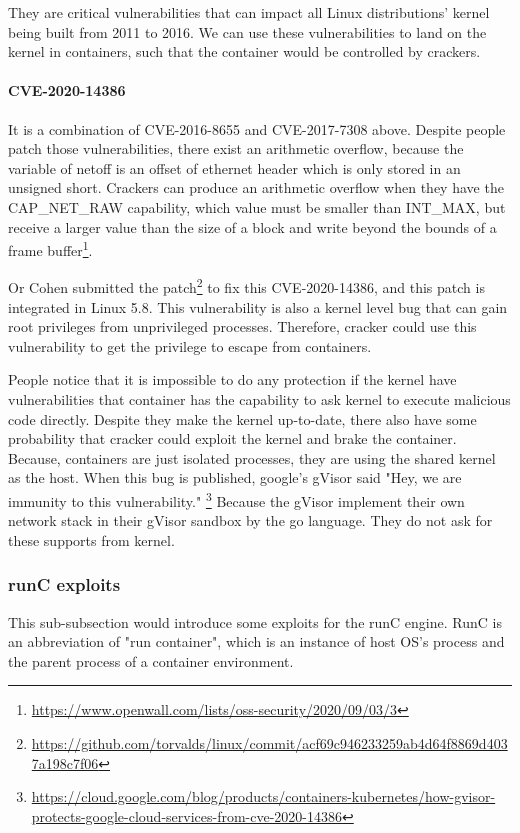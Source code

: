 They are critical vulnerabilities that can impact all Linux distributions' kernel being
built from 2011 to 2016. We can use these vulnerabilities to land on the kernel in
containers, such that the container would be controlled by crackers.

\paragraph{CVE-2020-14386} It is a combination of CVE-2016-8655 and CVE-2017-7308 above.
Despite people patch those vulnerabilities, there exist an arithmetic overflow, because
the variable of netoff is an offset of ethernet header which is only stored in an unsigned
short. Crackers can produce an arithmetic overflow when they have the CAP\_NET\_RAW capability,
which value must be smaller than INT\_MAX, but receive a larger value than the size of a
block and write beyond the bounds of a frame buffer\footnote{\url{https://www.openwall.com/lists/oss-security/2020/09/03/3}}.

Or Cohen submitted the patch\footnote{\url{https://github.com/torvalds/linux/commit/acf69c946233259ab4d64f8869d4037a198c7f06}}
to fix this CVE-2020-14386, and this patch is integrated in Linux 5.8. This vulnerability
is also a kernel level bug that can gain root privileges from unprivileged processes.
Therefore, cracker could use this vulnerability to get the privilege to escape from containers.

People notice that it is impossible to do any protection if the kernel have vulnerabilities
that container has the capability to ask kernel to execute malicious code directly. Despite
they make the kernel up-to-date, there also have some probability that cracker could exploit
the kernel and brake the container. Because, containers are just isolated processes, they
are using the shared kernel as the host. When this bug is published, google's gVisor said
"Hey, we are immunity to this vulnerability." \footnote{\url{https://cloud.google.com/blog/products/containers-kubernetes/how-gvisor-protects-google-cloud-services-from-cve-2020-14386}}
Because the gVisor implement their own network stack in their gVisor sandbox by the go language.
They do not ask for these supports from kernel.

\subsubsection{runC exploits}

This sub-subsection would introduce some exploits for the runC engine.
RunC is an abbreviation of "run container", which is an instance of host OS's process and the
parent process of a container environment.

